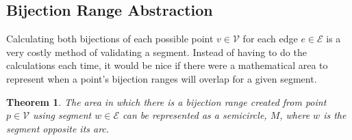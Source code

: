 \documentclass[12pt]{article}
\newtheorem{theorem}{Theorem}[section]
\begin{document}
\subsection{Bijection Range Abstraction}\label{subsec:bijection-range-method}
Calculating both bijections of each possible point $v \in \mathcal{V}$
for each edge $e \in \mathcal{E}$
is a very costly method of validating a segment. Instead of having to do the calculations
each time, it would be nice if there were a mathematical area to represent
when a point's bijection ranges will overlap for a given segment.
\begin{theorem}\label{thm:semicircle}
The area in which there is a bijection range created from point $p \in \mathcal{V}$
using segment $w \in \mathcal{E}$
can be represented as a semicircle, $M$, where $w$ is the segment opposite its arc.
\end{theorem}
\end{document}
